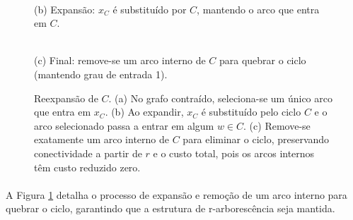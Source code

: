 \documentclass[12pt,a4paper]{article}
\begin{document}
\begin{figure}[htbp]
\begin{minipage}{.31\textwidth}
        \\[2pt]
        \small (b) Expansão: $x_C$ é substituído por $C$, mantendo o arco que entra em $C$.
    \end{minipage}\hfill
    \begin{minipage}{.31\textwidth}
        \centering
        \\[2pt]
        \small (c) Final: remove-se um arco interno de $C$ para quebrar o ciclo (mantendo grau de entrada 1).
    \end{minipage}
    \caption{Reexpansão de $C$. (a) No grafo contraído, seleciona-se um único arco que entra em $x_C$. (b) Ao expandir, $x_C$ é substituído pelo ciclo $C$ e o arco selecionado passa a entrar em algum $w\in C$. (c) Remove-se exatamente um arco interno de $C$ para eliminar o ciclo, preservando conectividade a partir de $r$ e o custo total, pois os arcos internos têm custo reduzido zero.}
    \label{fig:chu-liu-reexpansion}
\end{figure}

\paragraph{}
A Figura \ref{fig:chu-liu-reexpansion} detalha o processo de expansão e remoção de um arco interno para quebrar o ciclo, garantindo que a estrutura de r-arborescência seja mantida.
\end{document}
